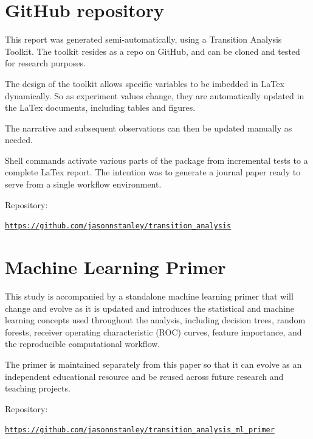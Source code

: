 \section{GitHub repository}

This report was generated semi-automatically, using a Transition Analysis Toolkit. The toolkit resides as a repo on GitHub, and can be cloned and tested for research purposes.

The design of the toolkit allows specific variables to be imbedded in LaTex dynamically. So as experiment values change, they are automatically updated in the LaTex documents, 
including tables and figures.

The narrative and subsequent observations can then be updated manually as needed.

Shell commands activate various parts of the package from incremental tests to a complete LaTex report. The intention was to generate a journal paper ready to serve from a single workflow environment.



\medskip

\noindent
Repository: \\

\bigskip

\href{https://github.com/jasonnstanley/transition_analysis}{\nolinkurl{https://github.com/jasonnstanley/transition_analysis}}


\section{Machine Learning Primer}

This study is accompanied by a standalone machine learning primer that will change and evolve as it is updated and introduces the statistical and machine learning concepts used throughout the analysis, including decision trees, random forests, receiver operating characteristic (ROC) curves, feature importance, and the reproducible computational workflow.

The primer is maintained separately from this paper so that it can evolve as an independent educational resource and be reused across future research and teaching projects.


\medskip

\noindent
Repository: \\

\bigskip

\href{https://github.com/jasonnstanley/transition_analysis_ml_primer}{\nolinkurl{https://github.com/jasonnstanley/transition_analysis_ml_primer}}